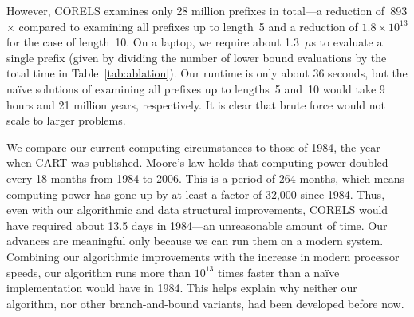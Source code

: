 \documentclass[twoside,11pt]{article}
\begin{document}
However, CORELS examines only 28 million prefixes in total---a reduction of~893$\times$ compared to examining
all prefixes up to length~5 and a reduction of ${1.8 \times 10^{13}}$ for the case of length~10.
%
On a laptop, we require about 1.3~$\mu$s to evaluate a single prefix (given by dividing the number of lower bound evaluations by the total time
in Table~\ref{tab:ablation}).
%
Our runtime is only about 36 seconds, but the na\"ive solutions of examining all prefixes up to
lengths~5 and~10 would take 9 hours and 21 million years, respectively.
%
It is clear that brute force would not scale to larger problems.

We compare our current computing circumstances to those of 1984, the year when CART was published.
%
Moore's law holds that computing power doubled every 18 months from 1984 to 2006.
%
This is a period of 264 months, which means computing power has gone up by at least a factor of 32,000 since 1984.
%
Thus, even with our algorithmic and data structural improvements,
CORELS would have required about 13.5 days in 1984---an unreasonable amount of time.
%
Our advances are meaningful only because we can run them on a modern system.
%
Combining our algorithmic improvements with the increase in modern processor speeds,
our algorithm runs more than $10^{13}$ times faster than a na\"ive implementation would have in 1984.
%
This helps explain why neither our algorithm, nor other branch-and-bound variants, had been developed before now.
\end{document}
